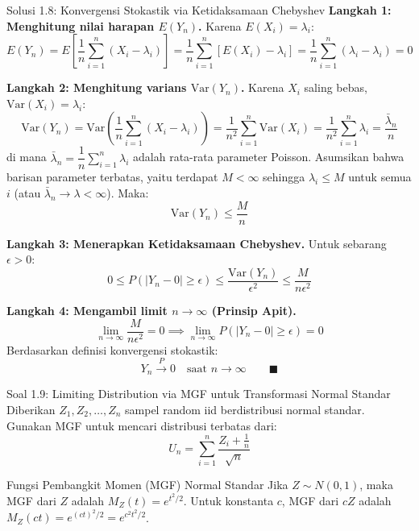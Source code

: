 \documentclass[10pt,twoside]{article}
\begin{document}
\begin{solbox}{Solusi 1.8: Konvergensi Stokastik via Ketidaksamaan Chebyshev}
\textbf{Langkah 1: Menghitung nilai harapan $E(Y_n)$.}
Karena $E(X_i) = \lambda_i$:
\[
E(Y_n) = E\left[\frac{1}{n} \sum_{i=1}^n (X_i - \lambda_i)\right] = \frac{1}{n} \sum_{i=1}^n [E(X_i) - \lambda_i] = \frac{1}{n} \sum_{i=1}^n (\lambda_i - \lambda_i) = 0
\]

\textbf{Langkah 2: Menghitung varians $\mathrm{Var}(Y_n)$.}
Karena $X_i$ saling bebas, $\mathrm{Var}(X_i) = \lambda_i$:
\[
\mathrm{Var}(Y_n) = \mathrm{Var}\left(\frac{1}{n}\sum_{i=1}^n (X_i - \lambda_i)\right) = \frac{1}{n^2}\sum_{i=1}^n \mathrm{Var}(X_i) = \frac{1}{n^2}\sum_{i=1}^n \lambda_i = \frac{\bar{\lambda}_n}{n}
\]
di mana $\bar{\lambda}_n = \dfrac{1}{n}\sum_{i=1}^n \lambda_i$ adalah rata-rata parameter Poisson. Asumsikan bahwa barisan parameter terbatas, yaitu terdapat $M < \infty$ sehingga $\lambda_i \le M$ untuk semua $i$ (atau $\bar{\lambda}_n \to \lambda < \infty$). Maka:
\[
\mathrm{Var}(Y_n) \le \frac{M}{n}
\]

\textbf{Langkah 3: Menerapkan Ketidaksamaan Chebyshev.}
Untuk sebarang $\epsilon > 0$:
\[
0 \le P(|Y_n - 0| \ge \epsilon) \le \frac{\mathrm{Var}(Y_n)}{\epsilon^2} \le \frac{M}{n\epsilon^2}
\]

\textbf{Langkah 4: Mengambil limit $n \to \infty$ (Prinsip Apit).}
\[
\lim_{n \to \infty} \frac{M}{n\epsilon^2} = 0 \implies \lim_{n \to \infty} P(|Y_n - 0| \ge \epsilon) = 0
\]
Berdasarkan definisi konvergensi stokastik:
\[
\boxed{Y_n \xrightarrow{P} 0 \quad \text{saat } n \to \infty} \qquad \blacksquare
\]
\end{solbox}

\begin{soalbox}{Soal 1.9: Limiting Distribution via MGF untuk Transformasi Normal Standar}
Diberikan $Z_1, Z_2, \dots, Z_n$ sampel random iid berdistribusi normal standar. Gunakan MGF untuk mencari distribusi terbatas dari:
\[
U_n = \sum_{i=1}^{n}\frac{Z_i + \frac{1}{n}}{\sqrt{n}}
\]
\end{soalbox}

\begin{tipbox}{Fungsi Pembangkit Momen (MGF) Normal Standar}
Jika $Z \sim N(0, 1)$, maka MGF dari $Z$ adalah $M_Z(t) = e^{t^2/2}$.
Untuk konstanta $c$, MGF dari $cZ$ adalah $M_Z(ct) = e^{(ct)^2/2} = e^{c^2 t^2/2}$.
\end{tipbox}
\end{document}
